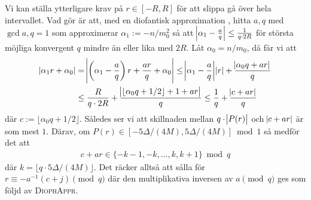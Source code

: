 Vi kan ställa ytterligare krav på \(r \in [-R, R]\) för att slippa gå över hela intervallet. Vad \cite{HaraldSieve} gör är att, med en diofantisk approximation , hitta \(a, q\) med \(\gcd{a,q} = 1\) som approximerar \(\alpha_1 := - n / m_0^2\) så att \(\abs{\alpha_1 - \frac{a}{q}} \leq \frac{1}{q \cdot 2R}\) för största möjliga konvergent $q$ mindre än eller lika med \(2R\). Låt \(\alpha_0 = n / m_0\), då får vi att
\begin{align*}
    \abs{\alpha_1 r + \alpha_0} &= \abs{\left(\alpha_1 - \frac{a}{q}\right) r + \frac{ar}{q} + \alpha_0} \leq 
    \abs{\alpha_1 - \frac{a}{q}} \abs{r} + \frac{\abs{\alpha_0 q + ar}}{q} \\
    &\leq \frac{R}{q \cdot 2R} + \frac{\abs{\lfloor \alpha_0 q + 1/2 \rfloor + 1 + ar}}{q} \leq
    \frac{1}{q} + \frac{\abs{c + ar}}{q}
\end{align*}
där \(c := \lfloor \alpha_0 q + 1/2 \rfloor\). Således ser vi att skillnaden mellan \(q \cdot \abs{P(r)}\) och \(\abs{c + ar}\) är som mest \(1\). Därav, om \(P(r) \in [-5\Delta/(4M), 5\Delta/(4M)] \bmod 1\) så medför det att
\begin{align*}
    c + ar \in \{- k - 1, - k, ... , k, k + 1\} \bmod q
\end{align*}
där \(k = \lfloor q \cdot 5\Delta/(4M) \rfloor\). Det räcker alltså att sålla för \(r \equiv - a^{-1} (c + j) \pmod{q}\) där den multiplikativa inversen av $a \pmod{q}$ ges som följd av \textsc{DiophAppr}. 



